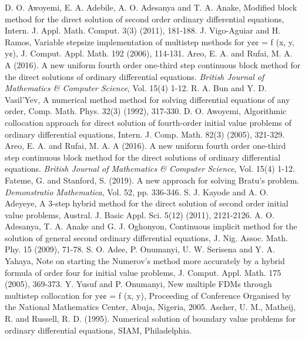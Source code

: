 \documentclass[12pt]{article}
\begin{document}
\cleardoublepage

\begin{thebibliography}{99}
	D. O. Awoyemi, E. A. Adebile, A. O. Adesanya and T. A. Anake, Modified block method for the direct solution of second order ordinary differential equations, Intern. J. Appl. Math. Comput. 3(3) (2011), 181-188.
	J. Vigo-Aguiar and H. Ramos, Variable stepsize implementation of multistep methods for y¢¢ = f (x, y, y¢), J. Comput. Appl. Math. 192 (2006), 114-131.
	Areo, E. A. and Rufai, M. A. A (2016). A new uniform fourth order one-third step continuous block method for the direct solutions of ordinary differential equations. \textit{British Journal of Mathematics \& Computer Science}, Vol. 15(4) 1-12.
	R. A. Bun and Y. D. Vasil’Yev, A numerical method method for solving differential
equations of any order, Comp. Math. Phys. 32(3) (1992), 317-330.
	D. O. Awoyemi, Algorithmic collocation approach for direct solution of fourth-order initial value problems of ordinary differential equations, Intern. J. Comp. Math. 82(3) (2005), 321-329.
	Areo, E. A. and Rufai, M. A. A (2016). A new uniform fourth order one-third step continuous block method for the direct solutions of ordinary differential equations. \textit{British Journal of Mathematics \& Computer Science}, Vol. 15(4) 1-12.
	Fateme, G. and Stanford, S. (2019). A new approach for solving Bratu’s problem. \textit{Demonstratio Mathematica}, Vol. 52, pp. 336-346.
	S. J. Kayode and A. O. Adeyeye, A 3-step hybrid method for the direct solution of second order initial value problems, Austral. J. Basic Appl. Sci. 5(12) (2011), 2121-2126.
	A. O. Adesanya, T. A. Anake and G. J. Oghonyon, Continuous implicit method for the solution of general second ordinary differential equations, J. Nig. Assoc. Math. Phy. 15 (2009), 71-78.
	S. O. Adee, P. Onumanyi, U. W. Serisena and Y. A. Yahaya, Note on starting the Numerov’s method more accurately by a hybrid formula of order four for initial value problems, J. Comput. Appl. Math. 175 (2005), 369-373.
	Y. Yusuf and P. Onumanyi, New multiple FDMs through multistep collocation for y¢¢ = f (x, y), Proceeding of Conference Organised by the National Mathematics Center, Abuja, Nigeria, 2005.
	Ascher, U. M., Matheij, R. and Russell, R. D. (1995). Numerical solution of boundary value problems for ordinary differential equations, SIAM, Philadelphia.

\end{thebibliography}
\end{document}
